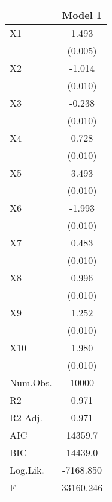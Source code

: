 \begin{table}
\centering
\begin{tabular}[t]{lc}
\toprule
  & Model 1\\
\midrule
X1 & 1.493\\
 & (0.005)\\
X2 & -1.014\\
 & \vphantom{8} (0.010)\\
X3 & -0.238\\
 & \vphantom{7} (0.010)\\
X4 & 0.728\\
 & \vphantom{6} (0.010)\\
X5 & 3.493\\
 & \vphantom{5} (0.010)\\
X6 & -1.993\\
 & \vphantom{4} (0.010)\\
X7 & 0.483\\
 & \vphantom{3} (0.010)\\
X8 & 0.996\\
 & \vphantom{2} (0.010)\\
X9 & 1.252\\
 & \vphantom{1} (0.010)\\
X10 & 1.980\\
 & (0.010)\\
\midrule
Num.Obs. & 10000\\
R2 & 0.971\\
R2 Adj. & 0.971\\
AIC & 14359.7\\
BIC & 14439.0\\
Log.Lik. & -7168.850\\
F & 33160.246\\
\bottomrule
\end{tabular}
\end{table}
